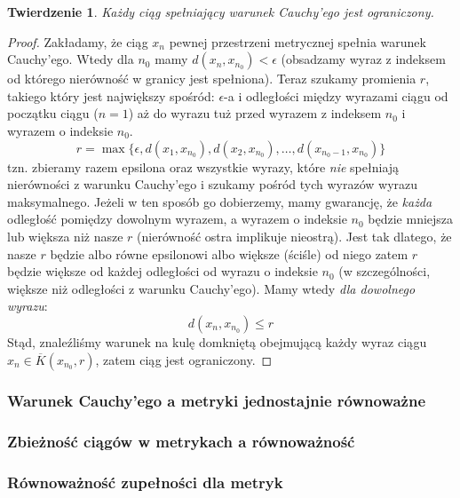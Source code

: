 \documentclass{article}
\newtheorem*{theorem}{Twierdzenie}
\begin{document}
\begin{theorem}
    Każdy ciąg spełniający warunek Cauchy'ego jest ograniczony.
\end{theorem}
\begin{proof}
    Zakładamy, że ciąg \(x_n\) pewnej przestrzeni metrycznej spełnia warunek Cauchy'ego. Wtedy dla
    \(n_0\) mamy \(d(x_n , x_{n_{0}}) < \epsilon\) (obsadzamy wyraz z indeksem od którego nierówność w granicy jest spełniona).
    Teraz szukamy promienia \(r\), takiego który jest największy spośród: \(\epsilon\)-a i odległości między wyrazami ciągu od 
    początku ciągu (\(n = 1\)) aż do wyrazu tuż przed wyrazem z indeksem \(n_0\) i wyrazem o indeksie \(n_0\).
    \begin{equation*}
        r = \max\{\epsilon, d(x_1, x_{n_0}), d(x_2, x_{n_0}), \dots, d(x_{n_{0} - 1}, x_{n_0})\}
    \end{equation*}
    tzn. zbieramy razem epsilona oraz wszystkie wyrazy, które \emph{nie} spełniają nierówności z warunku Cauchy'ego i szukamy
    pośród tych wyrazów wyrazu maksymalnego. Jeżeli w ten sposób go dobierzemy, mamy gwarancję, że \emph{każda} odległość pomiędzy
    dowolnym wyrazem, a wyrazem o indeksie \(n_0\) będzie mniejsza lub większa niż nasze \(r\) (nierówność ostra implikuje nieostrą).
    Jest tak dlatego, że nasze \(r\) będzie albo równe epsilonowi albo większe (ściśle) od niego zatem \(r\) będzie większe od każdej
    odległości od wyrazu o indeksie \(n_0\) (w szczególności, większe niż odległości z warunku Cauchy'ego).
    Mamy wtedy \emph{dla dowolnego wyrazu}:
    \begin{equation*}
        d(x_n, x_{n_{0}}) \leq r
    \end{equation*}
    Stąd, znaleźliśmy warunek na kulę domkniętą obejmującą każdy wyraz ciągu \( x_n \in \overline{K}(x_{n_{0}}, r)\),
    zatem ciąg jest ograniczony.
\end{proof}

\subsubsection{Warunek Cauchy'ego a metryki jednostajnie równoważne}
\subsubsection{Zbieżność ciągów w metrykach a równoważność}
\subsubsection{Równoważność zupełności dla metryk}
\end{document}
